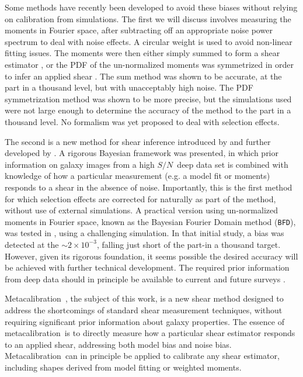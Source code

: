 \documentclass[iop]{emulateapj}
\newcommand{\snr}{$S/N$}
\newcommand{\mcal}{metacalibration}
\newcommand{\Mcal}{Metacalibration}
\newcommand{\bfd}{\texttt{BFD}}
\begin{document}
Some methods have recently been developed to avoid these biases without
relying on calibration from simulations.  The first we
will discuss \citep{Zhang2017} involves measuring the moments in Fourier space,
after subtracting off an appropriate noise power spectrum to deal with noise
effects.  A circular weight is used to avoid non-linear fitting issues.  The
moments were then either simply summed to form a shear estimator
\citep{Zhang2015}, or the PDF of the un-normalized moments was symmetrized in
order to infer an applied shear \citep{Zhang2017}.  The sum method was shown to
be accurate, at the part in a thousand level, but with unacceptably high noise.
The PDF symmetrization method was shown to be more precise, but the simulations
used were not large enough to determine the accuracy of the method to the part
in a thousand level.  No formalism was yet proposed to deal with selection
effects. 

The second is a new method for shear inference introduced by \cite{ba14} and
further developed by \cite{bfd2016}.  A rigorous Bayesian framework was
presented, in which prior information on galaxy images from a high \snr\ deep
data set is combined with knowledge of how a particular measurement (e.g. a
model fit or moments) responds to a shear in the absence of noise.
Importantly, this is the first method for which selection effects are corrected
for naturally as part of the method, without use of external simulations.
A practical version using un-normalized moments in Fourier space, 
known as the Bayesian Fourier Domain method (\bfd), was tested in \cite{bfd2016}, using
a challenging simulation.  In that initial study, a bias was detected at
the $\sim 2 \times 10^{-3}$, falling just short of the part-in a thousand
target.  However, given its rigorous foundation, it seems possible the desired
accuracy will be achieved with further technical development.  The required
prior information from deep data should in principle be available to current
and future surveys
\citep{DESWhitePaper,TakadaHSC2010,IvezicLSST08,Euclid2011,SpergelWFIRST2015}.

\Mcal\ \citep{HuffMcal}, the subject of this work, is a new shear
method designed to address the shortcomings of standard shear measurement
techniques, without requiring significant prior information about galaxy
properties.  The essence of \mcal\ is to directly measure how a particular
shear estimator responds to an applied shear, addressing both model bias and
noise bias.  \Mcal\ can in principle be applied to calibrate any shear
estimator, including shapes derived from model fitting or weighted moments.
\end{document}
